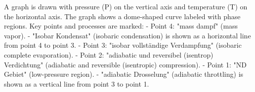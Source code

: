 A graph is drawn with pressure (P) on the vertical axis and temperature (T) on the horizontal axis. The graph shows a dome-shaped curve labeled with phase regions. Key points and processes are marked:  
- Point 4: "mass dampf" (mass vapor).  
- "Isobar Kondensat" (isobaric condensation) is shown as a horizontal line from point 4 to point 3.  
- Point 3: "isobar vollständige Verdampfung" (isobaric complete evaporation).  
- Point 2: "adiabatic und reversibel (isentrop) Verdichtung" (adiabatic and reversible (isentropic) compression).  
- Point 1: "ND Gebiet" (low-pressure region).  
- "adiabatic Drosselung" (adiabatic throttling) is shown as a vertical line from point 3 to point 1.